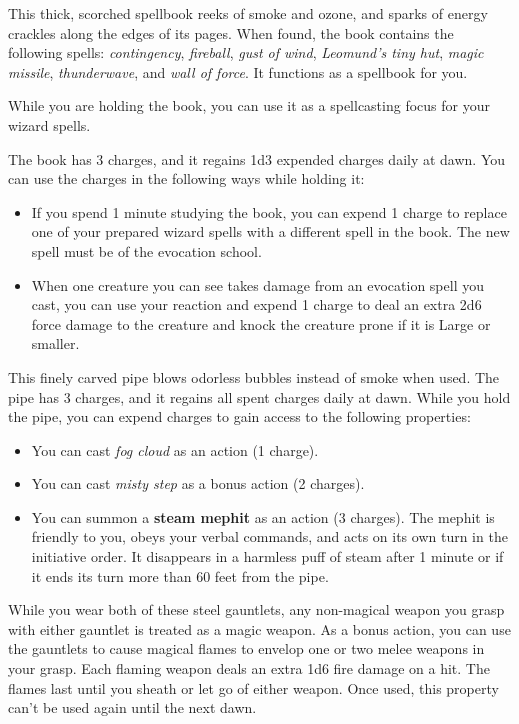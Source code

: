 \documentclass[10pt,a4paper,twoside,bg=print,twocolumn,openany,nodeprecatedcode]{dndbook}
\begin{document}
This thick, scorched spellbook reeks of smoke and ozone, and sparks of energy crackles along the edges of its pages. When found, the book contains the following spells: \textit{contingency}, \textit{fireball}, \textit{gust of wind}, \textit{Leomund's tiny hut}, \textit{magic missile}, \textit{thunderwave}, and \textit{wall of force}. It functions as a spellbook for you.

While you are holding the book, you can use it as a spellcasting focus for your wizard spells.

The book has 3 charges, and it regains 1d3 expended charges daily at dawn. You can use the charges in the following ways while holding it:


\begin{itemize}
\item If you spend 1 minute studying the book, you can expend 1 charge to replace one of your prepared wizard spells with a different spell in the book. The new spell must be of the evocation school.
\item When one creature you can see takes damage from an evocation spell you cast, you can use your reaction and expend 1 charge to deal an extra 2d6 force damage to the creature and knock the creature prone if it is Large or smaller.
\end{itemize}

This finely carved pipe blows odorless bubbles instead of smoke when used. The pipe has 3 charges, and it regains all spent charges daily at dawn. While you hold the pipe, you can expend charges to gain access to the following properties:


\begin{itemize}
\item You can cast \textit{fog cloud} as an action (1 charge).
\item You can cast \textit{misty step} as a bonus action (2 charges).
\item You can summon a \textbf{steam mephit} as an action (3 charges). The mephit is friendly to you, obeys your verbal commands, and acts on its own turn in the initiative order. It disappears in a harmless puff of steam after 1 minute or if it ends its turn more than 60 feet from the pipe.
\end{itemize}

While you wear both of these steel gauntlets, any non-magical weapon you grasp with either gauntlet is treated as a magic weapon. As a bonus action, you can use the gauntlets to cause magical flames to envelop one or two melee weapons in your grasp. Each flaming weapon deals an extra 1d6 fire damage on a hit. The flames last until you sheath or let go of either weapon. Once used, this property can't be used again until the next dawn.
\end{document}
